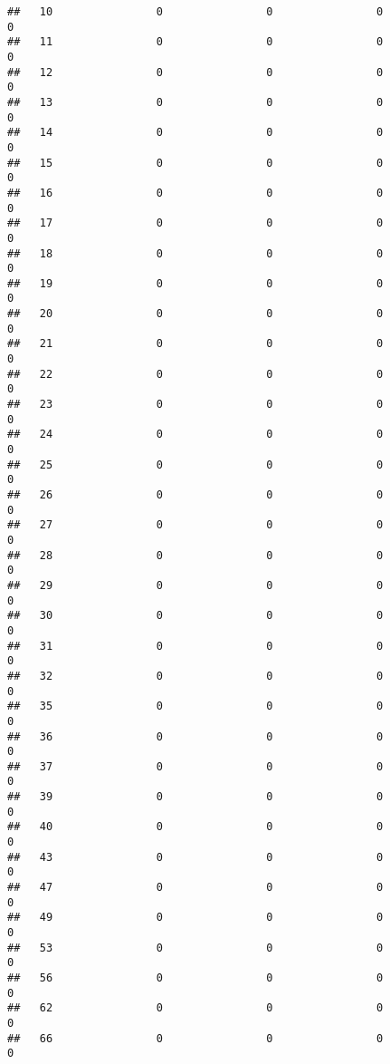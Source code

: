 \documentclass[]{article}
\begin{document}
\begin{verbatim}
##   10                0                0                0                0
##   11                0                0                0                0
##   12                0                0                0                0
##   13                0                0                0                0
##   14                0                0                0                0
##   15                0                0                0                0
##   16                0                0                0                0
##   17                0                0                0                0
##   18                0                0                0                0
##   19                0                0                0                0
##   20                0                0                0                0
##   21                0                0                0                0
##   22                0                0                0                0
##   23                0                0                0                0
##   24                0                0                0                0
##   25                0                0                0                0
##   26                0                0                0                0
##   27                0                0                0                0
##   28                0                0                0                0
##   29                0                0                0                0
##   30                0                0                0                0
##   31                0                0                0                0
##   32                0                0                0                0
##   35                0                0                0                0
##   36                0                0                0                0
##   37                0                0                0                0
##   39                0                0                0                0
##   40                0                0                0                0
##   43                0                0                0                0
##   47                0                0                0                0
##   49                0                0                0                0
##   53                0                0                0                0
##   56                0                0                0                0
##   62                0                0                0                0
##   66                0                0                0                0

\end{verbatim}
\end{document}
